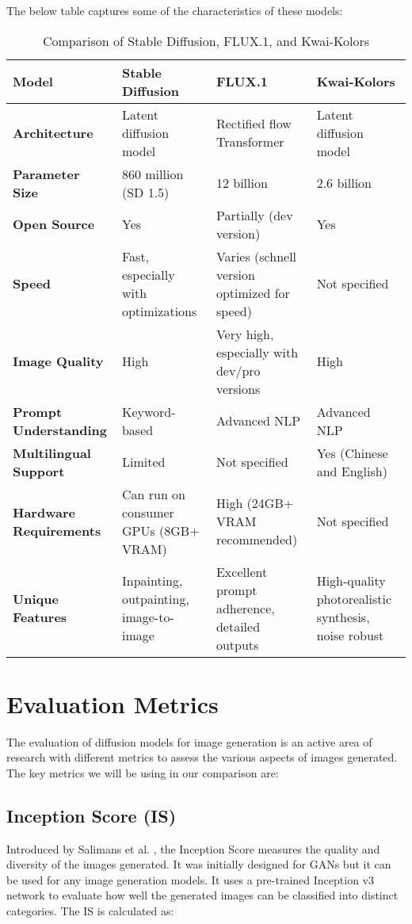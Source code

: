 \documentclass{article}
\begin{document}
The below table captures some of the characteristics of these models:
\begin{table}[h]
\centering
\begin{tabular}{|l|l|l|l|}
\hline
\textbf{Model} & \textbf{Stable Diffusion} & \textbf{FLUX.1} & \textbf{Kwai-Kolors} \\ \hline
\textbf{Architecture} & Latent diffusion model & Rectified flow Transformer & Latent diffusion model \\ \hline
\textbf{Parameter Size} & 860 million (SD 1.5) & 12 billion & 2.6 billion \\ \hline
\textbf{Open Source} & Yes & Partially (dev version) & Yes \\ \hline
\textbf{Speed} & Fast, especially with optimizations & Varies (schnell version optimized for speed) & Not specified \\ \hline
\textbf{Image Quality} & High & Very high, especially with dev/pro versions & High \\ \hline
\textbf{Prompt Understanding} & Keyword-based & Advanced NLP & Advanced NLP \\ \hline
\textbf{Multilingual Support} & Limited & Not specified & Yes (Chinese and English) \\ \hline
\textbf{Hardware Requirements} & Can run on consumer GPUs (8GB+ VRAM) & High (24GB+ VRAM recommended) & Not specified \\ \hline
\textbf{Unique Features} & Inpainting, outpainting, image-to-image & Excellent prompt adherence, detailed outputs & High-quality photorealistic synthesis, noise robust \\ \hline
\end{tabular}
\caption{Comparison of Stable Diffusion, FLUX.1, and Kwai-Kolors}
\end{table}


\section{Evaluation Metrics}
The evaluation of diffusion models for image generation is an active area of research with different metrics to assess the various
aspects of images generated. The key metrics we will be using in our comparison are:

\subsection{Inception Score (IS)}

Introduced by Salimans et al. \cite{salimans2016improved}, the Inception Score measures the quality and diversity of the images generated.
It was initially designed for GANs but it can be used for any image generation models. It uses a pre-trained Inception v3 network to 
evaluate how well the generated images can be classified into distinct categories. The IS is calculated as:
\end{document}
